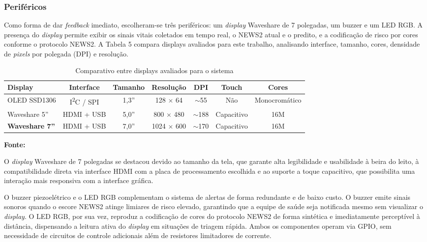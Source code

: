\subsubsection{Periféricos}

Como forma de dar \textit{feedback} imediato, escolheram-se três periféricos: um \textit{display} Waveshare de 7 polegadas, um buzzer e um LED RGB. A presença do \textit{display} permite exibir os sinais vitais coletados em tempo real, o NEWS2 atual e o predito, e a codificação de risco por cores conforme o protocolo NEWS2. A Tabela 5 compara displays avaliados para este trabalho, analisando interface, tamanho, cores, densidade de \textit{pixels} por polegada (DPI) e resolução.

\begin{table}[H]
\centering
\caption{Comparativo entre displays avaliados para o sistema}
\label{tableComparativoSensoresPPG}
\begin{tabular}{ |l|c|c|c|c|c|c| }
    \hline
    \textbf{Display} & \textbf{Interface} & \textbf{Tamanho} & \textbf{Resolução} & \textbf{DPI} & \textbf{Touch} & \textbf{Cores} \\
    \hline
    OLED SSD1306 & I\textsuperscript{2}C / SPI & 1,3'' & 128 $\times$ 64 & $\sim$55 & Não & Monocromático \\
    Waveshare 5'' & HDMI + USB & 5,0'' & 800 $\times$ 480 & $\sim$188 & Capacitivo & 16M \\
    \textbf{Waveshare 7''} & HDMI + USB & 7,0'' & 1024 $\times$ 600 & $\sim$170 & Capacitivo & 16M \\
    \hline
\end{tabular}
{\footnotesize \textbf{Fonte: \cite{ssd1306} \cite{waveshare5} \cite{waveshare7}}}
\end{table}

O \textit{display} Waveshare de 7 polegadas se destacou devido ao tamanho da tela, que garante alta legibilidade e usabilidade à beira do leito, à compatibilidade direta via interface HDMI com a placa de processamento escolhida e ao suporte a toque capacitivo, que possibilita uma interação mais responsiva com a interface gráfica.

O buzzer piezoelétrico e o LED RGB complementam o sistema de alertas de forma redundante e de baixo custo. O buzzer emite sinais sonoros quando o escore NEWS2 atinge limiares de risco elevado, garantindo que a equipe de saúde seja notificada mesmo sem visualizar o \textit{display}. O LED RGB, por sua vez, reproduz a codificação de cores do protocolo NEWS2 de forma sintética e imediatamente perceptível à distância, dispensando a leitura ativa do \textit{display} em situações de triagem rápida. Ambos os componentes operam via GPIO, sem necessidade de circuitos de controle adicionais além de resistores limitadores de corrente.

